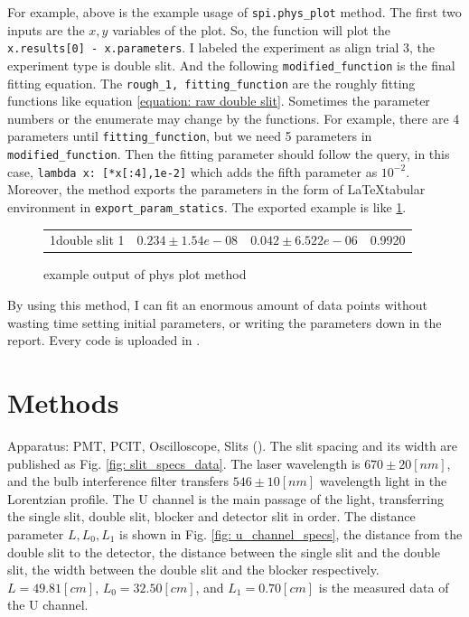 \documentclass{article}
\begin{document}
 For example, above is the example usage of \verb|spi.phys_plot| method.
 The first two inputs are the $x, y$ variables of the plot.
 So, the function will plot the \verb|x.results[0] - x.parameters|.
 I labeled the experiment as align trial 3, the experiment type is double slit.
 And the following \verb|modified_function| is the final fitting equation.
 The \verb|rough_1, fitting_function| are the roughly fitting functions like equation \ref{equation: raw double slit}.
 Sometimes the parameter numbers or the enumerate may change by the functions.
 For example, there are 4 parameters until \verb|fitting_function|, but we need 5 parameters in \verb|modified_function|.
 Then the fitting parameter should follow the query, in this case, \verb|lambda x: [*x[:4],1e-2]| which adds the fifth parameter as $10^{-2}$.
 Moreover, the method exports the parameters in the form of \LaTeX tabular environment in \verb|export_param_statics|.
 The exported example is like \ref{fig: tabular example}.

 \begin{figure}[H]
    \centering
    \begin{tabular}{c|c|c|c}
        \centering
        & & &  \\ \hline 
        1double slit 1& $0.234\pm 1.54e-08$& $0.042\pm 6.522e-06$& 0.9920
    \end{tabular}
    \caption{example output of phys plot method}
    \label{fig: tabular example}
\end{figure}
By using this method, I can fit an enormous amount of data points without wasting time setting initial parameters, or writing the parameters down in the report.
Every code is uploaded in \cite{github}.

\section{Methods}
Apparatus: PMT, PCIT, Oscilloscope, Slits (\cite{spi_spec}).
The slit spacing and its width are published as Fig. \ref{fig: slit_specs_data}.
The laser wavelength is $670 \pm 20 [nm]$, and the bulb interference filter transfers $546 \pm 10 [nm]$ wavelength light in the Lorentzian profile.
The U channel is the main passage of the light, transferring the single slit, double slit, blocker and detector slit in order.
The distance parameter $L, L_0, L_1$ is shown in Fig. \ref{fig: u_channel_specs}, the distance from the double slit to the detector, the distance between the single slit and the double slit, the width between the double slit and the blocker respectively.
$L = 49.81 [cm]$, $L_0 = 32.50 [cm]$, and $L_1 = 0.70 [cm]$ is the measured data of the U channel.
\end{document}
